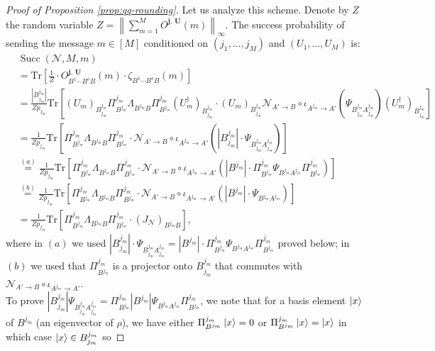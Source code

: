 \documentclass[a4paper,onecolumn,11pt,accepted=2025-10-01]{quantumarticle}
\DeclareMathOperator{\suc}{Succ}
\newcommand*{\cN}{\mathcal{N}}
\newcommand*{\tr}[1]{\mathrm{Tr}\left[#1\right]}
\begin{document}
\begin{proof}[Proof of Proposition \ref{prop:qq-rounding}]
Let us analyze this scheme. Denote by $Z$ the random variable $Z= {\left\|\sum_{m=1}^M O^{\bm{j}, \, \bm{U}}(m)\right\|_{\infty} }$. The success probability of sending the message $m\in [M]$ conditioned on $(j_1, \dots, j_M)$ and $(U_1, \dots, U_M)$ is:
\begin{align}
   & \suc(\cN, M, m)
   \\&= \tr{\tfrac{1}{Z}\cdot O^{\bm{j}, \, \bm{U}}_{B^1 \cdots B^{v}B}(m) \cdot   \zeta_{B^1 \cdots B^{v} B}(m)}
    \\&= \tfrac{|B_{j_m}^{j_m}|}{Zp_{j_m}}\tr{ (U_m)_{B_{j_m}^{j_m}}\Pi_{B^{j_m}}^{j_m} \Lambda_{B^{j_m} B} \Pi_{B^{j_m}}^{j_m}(U_m^\dagger)_{B_{j_m}^{j_m}}\!\cdot\!   (U_m)_{B_{j_m}^{j_m}} \cN_{A'\rightarrow B}\!\circ\! \iota_{A^{j_m}\rightarrow  A'}\!\left(\!\Psi_{B_{j_m}^{j_m}A_{j_m}^{j_m}}\!\right)\!(U_m^\dagger)_{B_{j_m}^{j_m}} }
    \\&= \tfrac{1}{Zp_{j_m}}\tr{ \Pi_{B^{j_m}}^{j_m} \Lambda_{B^{j_m} B} \Pi_{B^{j_m}}^{j_m} \cdot\cN_{A'\rightarrow B}\circ \iota_{A^{j_m}\rightarrow  A'}\left(|B_{j_m}^{j_m}|\cdot \Psi_{B_{j_m}^{j_m}A_{j_m}^{j_m}}\right) }
       \\&\overset{(a)}{=} \tfrac{1}{Zp_{j_m}}\tr{ \Pi_{B^{j_m}}^{j_m} \Lambda_{B^{j_m} B} \Pi_{B^{j_m}}^{j_m} \cdot\cN_{A'\rightarrow B}\circ \iota_{A^{j_m}\rightarrow  A'}\left(|B^{j_m}|\cdot \Pi_{B^{j_m}}^{j_m}  \Psi_{B^{j_m}A^{j_m}}\Pi_{B^{j_m}}^{j_m} \right) }
      \\&\overset{(b)}{=} \tfrac{1}{Zp_{j_m}}\tr{ \Pi_{B^{j_m}}^{j_m} \Lambda_{B^{j_m} B} \Pi_{B^{j_m}}^{j_m} \cdot\cN_{A'\rightarrow B}\circ \iota_{A^{j_m}\rightarrow  A'}\left(|B^{j_m}| \cdot \Psi_{B^{j_m}A^{j_m}}\right) }
      \\& =\tfrac{1}{Zp_{j_m}}\tr{ \Pi_{B^{j_m}}^{j_m} \Lambda_{B^{j_m} B} \Pi_{B^{j_m}}^{j_m} \cdot(J_{\cN})_{B^{j_m} B} }, \label{eq:suc1}
\end{align}
\sloppy where in $(a)$ we used   $ |B_{j_m}^{j_m}|\cdot \Psi_{B_{j_m}^{j_m}A_{j_m}^{j_m}} = |B^{j_m}|\cdot \Pi_{B^{j_m}}^{j_m} \Psi_{B^{j_m}A^{j_m}}\Pi_{B^{j_m}}^{j_m}$  proved below;  in $(b)$ we used  that $\Pi_{B^{j_m}}^{j_m}$ is a projector onto  $B_{j_m}^{j_m}$ that commutes with $\cN_{A'\rightarrow B}\circ \iota_{A^{j_m}\rightarrow  A'}$. 
\\To prove $ |B_{j_m}^{j_m}|\Psi_{B_{j_m}^{j_m}A_{j_m}^{j_m}} = \Pi_{B^{j_m}}^{j_m}|B^{j_m}| \Psi_{B^{j_m}A^{j_m}}\Pi_{B^{j_m}}^{j_m}$, we note that for a basis element $\ket{x}$ of $B^{j_m}$ (an eigenvector of $\rho$), we have either $\Pi_{B^{j_m}}^{j_m} \ket{x} = 0$ or $\Pi_{B^{j_m}}^{j_m} \ket{x} = \ket{x}$ in which case $\ket{x}\in B_{j_m}^{j_m}$ so 

\end{proof}
\end{document}
